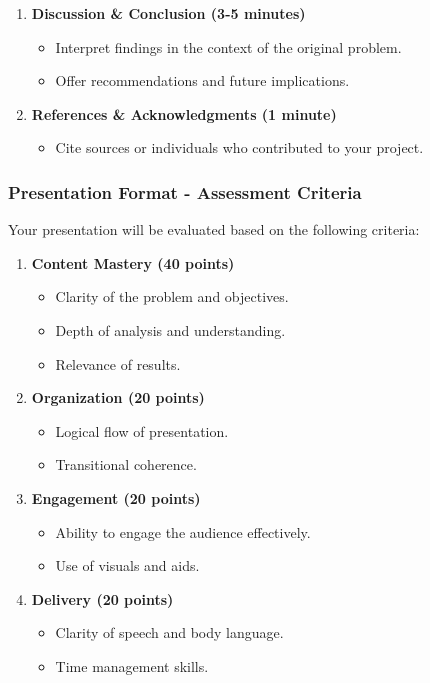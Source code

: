 \documentclass{beamer}
\begin{document}
\begin{frame}[fragile]
\begin{enumerate}
        \item \textbf{Discussion \& Conclusion (3-5 minutes)}
            \begin{itemize}
                \item Interpret findings in the context of the original problem.
                \item Offer recommendations and future implications.
            \end{itemize}
        \item \textbf{References \& Acknowledgments (1 minute)}
            \begin{itemize}
                \item Cite sources or individuals who contributed to your project.
            \end{itemize}
    \end{enumerate}
\end{frame}

\begin{frame}[fragile]
    \frametitle{Presentation Format - Assessment Criteria}
    Your presentation will be evaluated based on the following criteria:
    \begin{enumerate}
        \item \textbf{Content Mastery (40 points)}
            \begin{itemize}
                \item Clarity of the problem and objectives.
                \item Depth of analysis and understanding.
                \item Relevance of results.
            \end{itemize}
        \item \textbf{Organization (20 points)}
            \begin{itemize}
                \item Logical flow of presentation.
                \item Transitional coherence.
            \end{itemize}
        \item \textbf{Engagement (20 points)}
            \begin{itemize}
                \item Ability to engage the audience effectively.
                \item Use of visuals and aids.
            \end{itemize}
        \item \textbf{Delivery (20 points)}
            \begin{itemize}
                \item Clarity of speech and body language.
                \item Time management skills.
            \end{itemize}
    \end{enumerate}
\end{frame}
\end{document}

